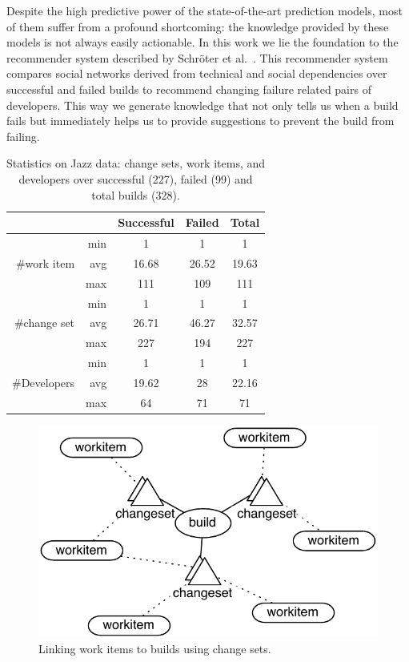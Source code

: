 Despite the high predictive power of the state-of-the-art prediction models, most
of them suffer from a profound shortcoming: the knowledge provided by these
models is not always easily actionable. In this work we lie the foundation to
the recommender system described by Schr\"oter et
al.~\cite{schroeter:rsse:2008}. 
%
This recommender system compares social networks derived from technical and social dependencies over successful and failed builds to recommend changing failure related pairs of developers.
%
%
This way we generate knowledge that not only tells us when a build fails but immediately helps us to provide suggestions to prevent the build from failing.








\begin{table}[t]
\centering
\begin{tabular}{rrccc}
\toprule
& & Successful & Failed & Total\\
\midrule
&min &1&1&1\\
\#work item & avg  & 16.68&26.52&19.63\\
& max & 111&109&111\\
\midrule
& min & 1&1&1\\
\#change set & avg  & 26.71&46.27&32.57\\
& max & 227&194&227\\
\midrule
& min & 1&1&1\\
\#Developers & avg  & 19.62&28&22.16\\
& max &64&71&71\\
\bottomrule
\end{tabular}
\caption{Statistics on Jazz data: change sets, work items, 
and developers over successful (227), failed (99) and total builds (328).}
\label{tab:jazzbuildinfo}
\end{table}

\begin{figure}[b]
\centering
\includegraphics[width=.9\columnwidth]{figures/buildworkitem}
\caption{Linking work items to builds using change sets.}
\label{fig:buildtowork item}
\end{figure}

